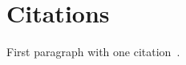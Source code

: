 \documentclass[main.tex]{subfiles}
\begin{document}
\section{Citations}

First paragraph with one citation~\cite{mycite}.
\end{document}

